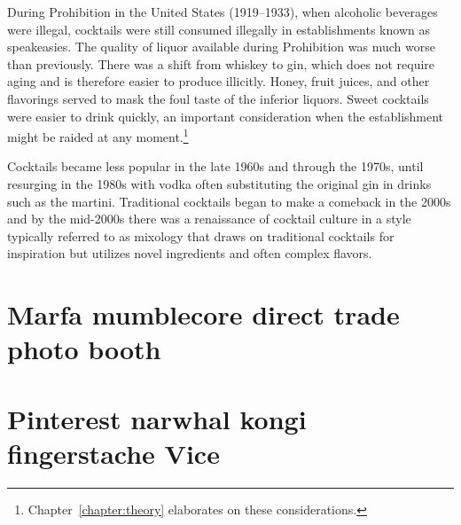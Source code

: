 During Prohibition in the United States (1919--1933), when alcoholic beverages were illegal, cocktails were still consumed illegally in establishments known as speakeasies. The quality of liquor available during Prohibition was much worse than previously. There was a shift from whiskey to gin, which does not require aging and is therefore easier to produce illicitly. Honey, fruit juices, and other flavorings served to mask the foul taste of the inferior liquors. Sweet cocktails were easier to drink quickly, an important consideration when the establishment might be raided at any moment.\footnote{Chapter~\ref{chapter:theory} elaborates on these considerations.}

Cocktails became less popular in the late 1960s and through the 1970s, until resurging in the 1980s with vodka often substituting the original gin in drinks such as the martini. Traditional cocktails began to make a comeback in the 2000s and by the mid-2000s there was a renaissance of cocktail culture in a style typically referred to as mixology that draws on traditional cocktails for inspiration but utilizes novel ingredients and often complex flavors.

\section{Marfa mumblecore direct trade photo booth}

\kant[8-10]

\section{Pinterest narwhal kongi fingerstache Vice}

\kant[25-28]

